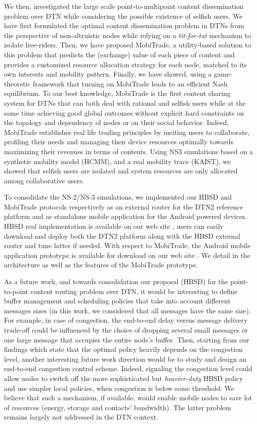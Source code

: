 We then, investigated the large scale point-to-multipoint content dissemination problem over DTN while considering the possible existence of selfish users. We have first formulated the optimal content dissemination problem in DTNs from the perspective of non-altruistic nodes while relying on a \emph{tit-for-tat} mechanism to isolate free-riders. Then, we have proposed MobiTrade, a utility-based solution to this problem that predicts the (exchange) value of each piece of content and provides a customized resource allocation strategy for each node, matched to its own interests and mobility pattern. Finally, we have showed, using a game-theoretic framework that turning on MobiTrade leads to an efficient Nash equilibrium. To our best knowledge, MobiTrade is the first content sharing
system for DTNs that can both deal with rational and selfish users while at the same time achieving good global outcomes
without explicit hard constraints on the topology and dependency of nodes or on their social behavior. Indeed, MobiTrade establishes real life trading principles by inciting users to collaborate, profiling their needs and managing their device resources optimally towards maximizing their revenues in terms of contents. Using NS3 simulations based on a synthetic mobility model (HCMM), and a real mobility trace (KAIST), we showed that selfish users are isolated and system resources are only allocated among collaborative users. 

To consolidate the NS-2/NS-3 simulations, we implemented our HBSD and MobiTrade protocols respectively as an external router for the DTN2 reference platform and as standalone mobile application for the Android powered devices. HBSD real implementation is available on our web site \cite{HBSDDTN2}, users can easily download and deploy both the DTN2 platform along with the HBSD external router and tune latter if needed. With respect to MobiTrade, the Android mobile application prototype is available for download on our web site \cite{MobiTradeAndroid}. We detail in \cite{MobiTradeAndroid} the architecture as well as the features of the MobiTrade prototype. 

As a future work, and towards consolidation our proposal (HBSD) for the point-to-point content routing problem over DTN, it would be interesting to define buffer management and scheduling policies that take into account different messages sizes (in this work, we considered that all messages have the same size). For example, in case of congestion, the end-to-end delay versus message delivery trade-off could be influenced by the choice of dropping several small messages or one large message that occupies the entire node's buffer. Then, starting from our findings which state that 
the optimal policy heavily depends on the congestion level, another interesting future work direction would be to study and design an end-to-end congestion control scheme. Indeed, signaling the congestion level could allow nodes to switch off the more sophisticated but \emph{heavier-duty} HBSD policy and use simpler local policies, when congestion is below
some threshold. We believe that such a mechanism, if available, would enable mobile nodes to save lot of resources (energy, storage and contacts' bandwidth). The latter problem remains largely not addressed in the DTN context.

